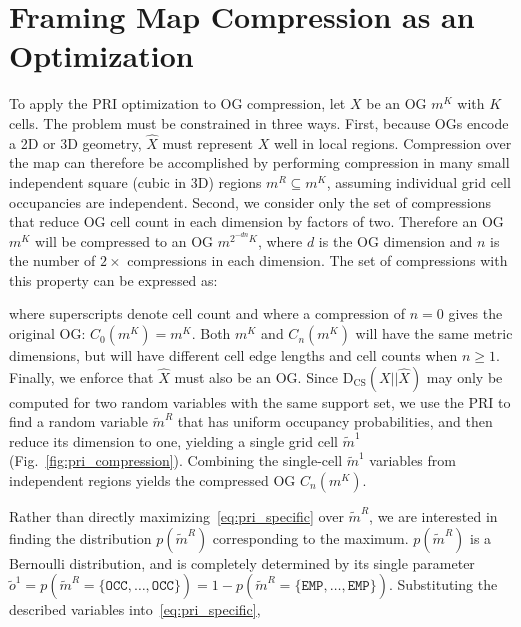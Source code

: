 \section{Framing Map Compression as an Optimization}

To apply the PRI optimization to OG compression, let $X$ be an OG $m^{K}$ with $K$ cells.
The problem must be constrained in three ways. First, because OGs encode a 2D or 3D geometry,
$\hat{X}$ must represent $X$ well in local regions. Compression over the map can therefore
be accomplished by performing compression in many small independent square (cubic in 3D)
regions $m^{R} \subseteq m^{K}$, assuming individual grid cell occupancies are independent.
Second, we consider only the set of compressions that reduce OG cell count in each dimension
by factors of two. Therefore an OG $m^{K}$ will be compressed to an OG $m^{2^{-dn}K}$, where
$d$ is the OG dimension and $n$ is the number of $2\times$ compressions in each dimension. The
set of compressions with this property can be expressed as:
%

where superscripts denote cell count and where a compression of $n=0$ gives the original OG:
$C_{0}(m^{K}) = m^{K}$. Both $m^{K}$ and $C_{n}(m^{K})$ will have the same metric dimensions,
but will have different cell edge lengths and cell counts when $n \ge 1$. Finally, we enforce
that $\hat{X}$ must also be an OG. Since $\text{D}_{\text{CS}}(X\vert \vert \hat{X})$ may only
be computed for two random variables with the same support set, we use the PRI to find a random
variable $\tilde{m}^{R}$ that has uniform occupancy probabilities, and then reduce its dimension
to one, yielding a single grid cell $\tilde{m}^{1}$ (Fig.~\ref{fig:pri_compression}). Combining the
single-cell $\tilde{m}^{1}$ variables from independent regions yields the compressed OG $C_{n}(m^{K})$.

Rather than directly maximizing~\eqref{eq:pri_specific} over $\tilde{m}^{R}$, we are interested in
finding the distribution $p(\tilde{m}^{R})$ corresponding to the maximum. $p(\tilde{m}^{R})$ is a
Bernoulli distribution, and is completely determined by its single parameter
$\tilde{o}^{1} = p(\tilde{m}^{R} = \{\texttt{OCC},\dots,\texttt{OCC}\}) = 1 -
p(\tilde{m}^{R} = \{\texttt{EMP},\dots,\texttt{EMP}\})$. Substituting the described
variables into~\eqref{eq:pri_specific},
%

